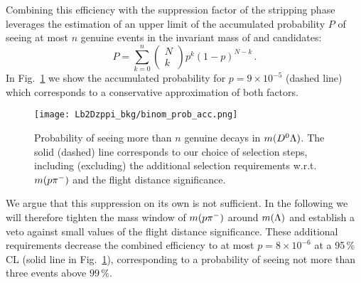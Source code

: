Combining this efficiency with the suppression factor of the \gls{stripping} phase leverages the estimation of an upper limit of the accumulated probability $P$ of seeing at most $n$ genuine \decay{\Lb}{\Dz\proton\pim} events in the invariant mass of \Dz and \Lz candidates:
\begin{equation*}
    P = \sum_{k=0}^n \begin{pmatrix} N \\ k \end{pmatrix} p^k (1-p)^{N-k} \,.
\end{equation*}
In Fig.~\ref{fig:LbToDzppi_bkg_efflimit} we show the accumulated probability for $p=9 \times 10^{-5}$ (dashed line) which corresponds to a conservative approximation of both factors.
\begin{figure}[htbp]
    \centering
    \texttt{[image: Lb2Dzppi\_bkg/binom\_prob\_acc.png]}
    \caption{Probability of seeing more than $n$ genuine \decay{\Lb}{\Dz\proton\pim} decays in $m({{D}^0}{\Lambda})$. The solid (dashed) line corresponds to our choice of selection steps, including (excluding) the additional selection requirements w.r.t.\ $m({p}{{\pi}^-})$ and the \Lz flight distance significance.}
    \label{fig:LbToDzppi_bkg_efflimit}
\end{figure}
We argue that this suppression on its own is not sufficient.
In the following we will therefore tighten the mass window of $m({p}{{\pi}^-})$ around $m({\Lambda})$ and establish a veto against small values of the \Lz flight distance significance.
These additional requirements decrease the combined efficiency to at most $p=8 \times 10^{-6}$ at a 95\,\% CL (solid line in Fig.~\ref{fig:LbToDzppi_bkg_efflimit}), corresponding to a probability of seeing not more than three events above $99\,\%$.

